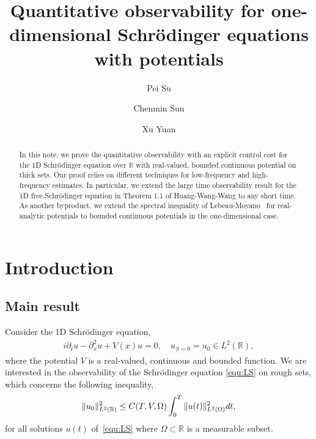 \documentclass[a4paper,reqno]{amsart}
\theoremstyle{definition}
\numberwithin{equation}{section}
\newcommand{\R}{\mathbb{R}}
\def \R {{\mathbb{R} }}
\def \d {{\rm{d}}}
\def \pt{\partial_{t}}
\begin{document}
	

\parindent=0pt

	\title[Observability for 1D Schr\"odinger equations]
	{Quantitative observability for one-dimensional Schr\"odinger equations with potentials}
	
	\author[P. Su]{Pei Su}
	\address{Department of Mathematical Analysis,
Faculty of Mathematics and Physics,
Charles University,
Sokolovská 83,
186 75 Praha 8, Czech Republic.
\newline
Present address: Laboratoire de Mathématiques d’Orsay (UMR 8628), Université Paris-Saclay, CNRS, 91405 Orsay Cedex, France.
}
	
	\author[C. Sun]{Chenmin Sun}
	\address{CNRS, Universit\'e Paris-Est Cr\'eteil, Laboratoire d'Analyse et de Math\'ematiques appliqu\'ees, UMR  8050 du CNRS, 
	94010 Cr\'eteil cedex, France.}
	
	\author[X.~Yuan]{Xu Yuan}
	\address{Academy of Mathematics and Systems Science, Chinese Academy of Sciences, Beijing 100190, P.R. China.}
	
	\begin{abstract}
  In this note, we prove the quantitative observability with an explicit control cost for the 1D Schr\"odinger equation over $\R$ with real-valued, bounded continuous potential on thick sets.  Our proof relies on different techniques for low-frequency and high-frequency estimates. In particular, we extend the large time observability result for the 1D free Schr\"odinger equation in Theorem 1.1 of Huang-Wang-Wang \cite{HWW} to any short time. 
	As another byproduct, we extend the spectral inequality of Lebeau-Moyano~\cite{LeM} for real-analytic potentials to bounded continuous potentials in the one-dimensional case. 
 \end{abstract}
	\maketitle
\section{Introduction}
\subsection{Main result}
Consider the 1D Schr\"odinger equation, 
   \begin{equation}\label{equ:LS}
   \begin{aligned}
   i\pt u-\partial_{x}^{2}u+V(x)u=0,\quad u_{|t=0}=u_{0}\in L^{2}(\R),
   \end{aligned}
   \end{equation}
  where the potential $V$ is a real-valued, continuous and bounded function. We are interested in the observability of the Schr\"odinger equation \eqref{equ:LS} on rough sets, which concerns the following inequality,
\begin{equation}\label{def:ob}
	\|u_0\|_{L^2(\R)}^2 \leq C(T,V,\Omega) \int_0^T \|u(t)\|_{L^2(\Omega)}^2 \d t,
\end{equation}
for all solutions $u(t)$ of~\eqref{equ:LS} where $\Omega \subset \R$ is a measurable subset.
\end{document}
